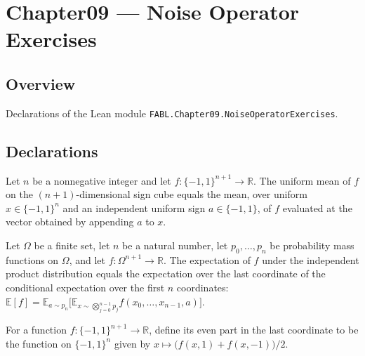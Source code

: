 \chapter{Chapter09 — Noise Operator Exercises}
\section{Overview}

Declarations of the Lean module \texttt{FABL.Chapter09.NoiseOperatorExercises}.

\section{Declarations}

\begin{theorem}
\label{FABL.expect_snoc}
\leanok
{}
Let $n$ be a nonnegative integer and let $f:\{-1,1\}^{n+1}\to\mathbb{R}$. The uniform
mean of $f$ on the $(n+1)$-dimensional sign cube equals the mean, over uniform
$x\in\{-1,1\}^n$ and an independent uniform sign $a\in\{-1,1\}$, of $f$ evaluated at the
vector obtained by appending $a$ to $x$.
\end{theorem}

\begin{theorem}
\label{FABL.pmfExpectation_independentProductPMF_succ}
\leanok
{}
Let $\Omega$ be a finite set, let $n$ be a natural number, let $p_0,\ldots,p_n$ be
probability mass functions on $\Omega$, and let $f:\Omega^{n+1}\to\mathbb{R}$. The
expectation of $f$ under the independent product distribution equals the expectation
over the last coordinate of the conditional expectation over the first $n$ coordinates:
$\mathbb{E}[f]=\mathbb{E}_{a\sim
p_n}\bigl[\mathbb{E}_{x\sim\bigotimes_{j=0}^{n-1}p_j}f(x_0,\ldots,x_{n-1},a)\bigr]$.
\end{theorem}

\begin{definition}
\label{FABL.lastEvenPart}
\leanok
For a function $f:\{-1,1\}^{n+1}\to\mathbb R$, define its even part in the last
coordinate to be the function on $\{-1,1\}^n$ given by $x\mapsto
\bigl(f(x,1)+f(x,-1)\bigr)/2$.
\end{definition}

